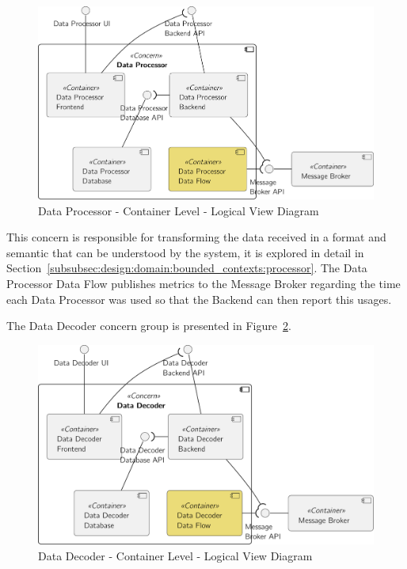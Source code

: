\begin{figure}[H]
   \centering
   \includegraphics[page=1,width=0.8\columnwidth]{assets/diagrams/design/architectural/level2/logical/data-processor-context.pdf}
   \caption[Data Processor - Container Level - Logical View Diagram]{Data Processor - Container Level - Logical View Diagram}
   \label{fig:design:architecture:platform:containers:logical:processor}
\end{figure}

This concern is responsible for transforming the data received in a format and semantic that can be understood by the system, it is explored in detail in Section~\ref{subsubsec:design:domain:bounded_contexts:processor}. The Data Processor Data Flow publishes metrics to the Message Broker regarding the time each Data Processor was used so that the Backend can then report this usages.

The Data Decoder concern group is presented in Figure~\ref{fig:design:architecture:platform:containers:logical:decoder}.

\begin{figure}[H]
   \centering
   \includegraphics[page=1,width=0.8\columnwidth]{assets/diagrams/design/architectural/level2/logical/data-decoder-context.pdf}
   \caption[Data Decoder - Container Level - Logical View Diagram]{Data Decoder - Container Level - Logical View Diagram}
   \label{fig:design:architecture:platform:containers:logical:decoder}
\end{figure}

